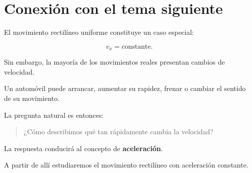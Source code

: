 \section{Conexión con el tema siguiente}

El movimiento rectilíneo uniforme constituye un caso especial:

\[ v_x=\text{constante}. \]

Sin embargo, la mayoría de los movimientos reales presentan cambios de
velocidad.

Un automóvil puede arrancar, aumentar su rapidez, frenar o cambiar el sentido
de su movimiento.

La pregunta natural es entonces:

\begin{quote}
¿Cómo describimos qué tan rápidamente cambia la velocidad?
\end{quote}

La respuesta conducirá al concepto de \textbf{aceleración}.

A partir de allí estudiaremos el movimiento rectilíneo con aceleración
constante.


